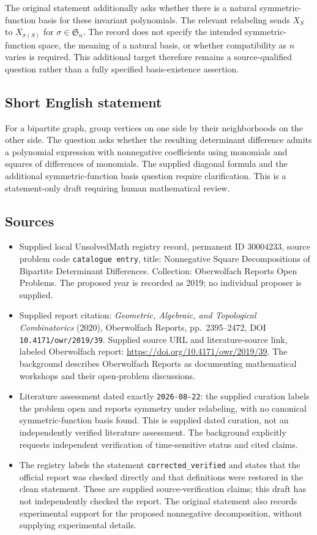 \documentclass[11pt]{article}
\begin{document}
The original statement additionally asks whether there is a natural symmetric-function basis for these invariant polynomials. The relevant relabeling sends \(X_S\) to \(X_{\sigma(S)}\) for \(\sigma\in\mathfrak S_n\). The record does not specify the intended symmetric-function space, the meaning of a natural basis, or whether compatibility as \(n\) varies is required. This additional target therefore remains a source-qualified question rather than a fully specified basis-existence assertion.
\subsection{Short English statement}
For a bipartite graph, group vertices on one side by their neighborhoods on the other side. The question asks whether the resulting determinant difference admits a polynomial expression with nonnegative coefficients using monomials and squares of differences of monomials. The supplied diagonal formula and the additional symmetric-function basis question require clarification. This is a statement-only draft requiring human mathematical review.
\subsection{Sources}
\begin{itemize}
\item Supplied local UnsolvedMath registry record, permanent ID \(30004233\), source problem code \texttt{catalogue entry}, title: Nonnegative Square Decompositions of Bipartite Determinant Differences. Collection: Oberwolfach Reports Open Problems. The proposed year is recorded as 2019; no individual proposer is supplied.
\item Supplied report citation: \emph{Geometric, Algebraic, and Topological Combinatorics} (2020), Oberwolfach Reports, pp.\ 2395--2472, DOI \texttt{10.4171/owr/2019/39}. Supplied source URL and literature-source link, labeled Oberwolfach report: \url{https://doi.org/10.4171/owr/2019/39}. The background describes Oberwolfach Reports as documenting mathematical workshops and their open-problem discussions.
\item Literature assessment dated exactly \texttt{2026-08-22}: the supplied curation labels the problem open and reports symmetry under relabeling, with no canonical symmetric-function basis found. This is supplied dated curation, not an independently verified literature assessment. The background explicitly requests independent verification of time-sensitive status and cited claims.
\item The registry labels the statement \texttt{corrected\_verified} and states that the official report was checked directly and that definitions were restored in the clean statement. These are supplied source-verification claims; this draft has not independently checked the report. The original statement also records experimental support for the proposed nonnegative decomposition, without supplying experimental details.
\end{itemize}
\end{document}
